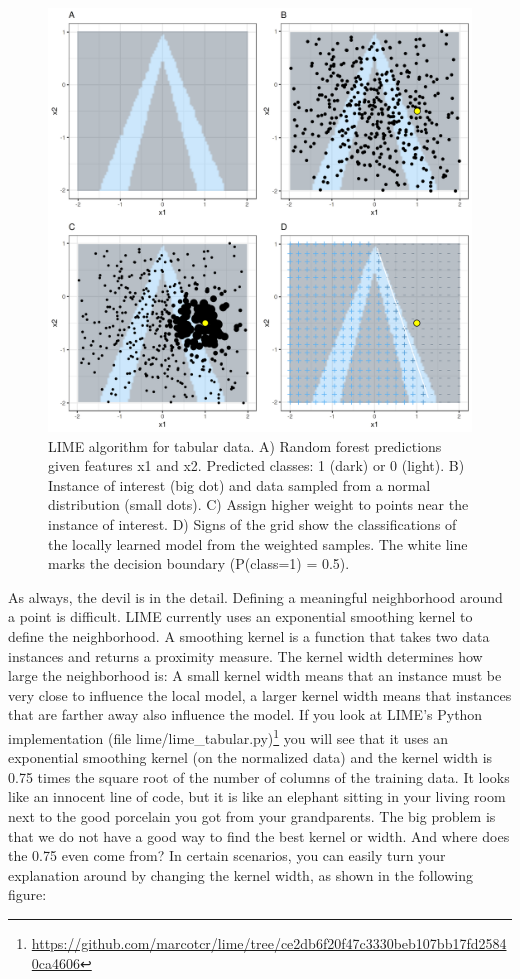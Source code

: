 \documentclass[12pt,]{krantz}
\renewcommand{\href}[2]{#2\footnote{\url{#1}}}
\begin{document}
\begin{figure}

{\centering \includegraphics[width=\textwidth]{images/lime-fitting-1} 

}

\caption{LIME algorithm for tabular data. A) Random forest predictions given features x1 and x2. Predicted classes: 1 (dark) or 0 (light). B) Instance of interest (big dot) and data sampled from a normal distribution (small dots). C) Assign higher weight to points near the instance of interest. D) Signs of the grid show the classifications of the locally learned model from the weighted samples. The white line marks the decision boundary (P(class=1) = 0.5).}\label{fig:lime-fitting}
\end{figure}

As always, the devil is in the detail. Defining a meaningful
neighborhood around a point is difficult. LIME currently uses an
exponential smoothing kernel to define the neighborhood. A smoothing
kernel is a function that takes two data instances and returns a
proximity measure. The kernel width determines how large the
neighborhood is: A small kernel width means that an instance must be
very close to influence the local model, a larger kernel width means
that instances that are farther away also influence the model. If you
look at
\href{https://github.com/marcotcr/lime/tree/ce2db6f20f47c3330beb107bb17fd25840ca4606}{LIME's
Python implementation (file lime/lime\_tabular.py)} you will see that it
uses an exponential smoothing kernel (on the normalized data) and the
kernel width is 0.75 times the square root of the number of columns of
the training data. It looks like an innocent line of code, but it is
like an elephant sitting in your living room next to the good porcelain
you got from your grandparents. The big problem is that we do not have a
good way to find the best kernel or width. And where does the 0.75 even
come from? In certain scenarios, you can easily turn your explanation
around by changing the kernel width, as shown in the following figure:
\end{document}
